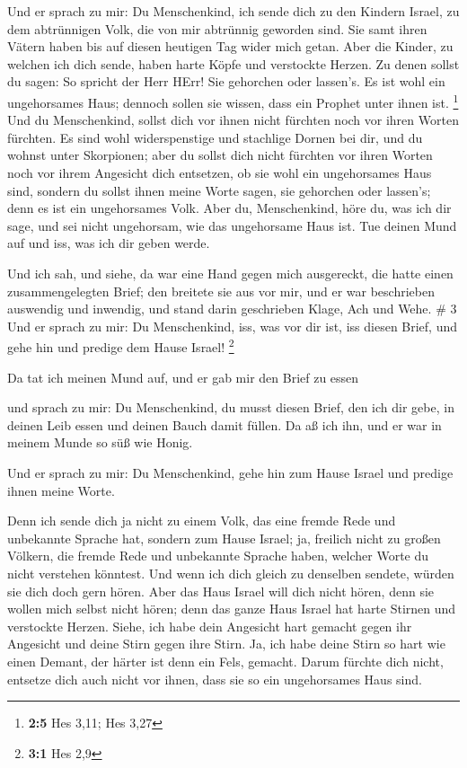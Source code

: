  Und er sprach zu mir: Du Menschenkind, ich sende dich zu
den Kindern Israel, zu dem abtrünnigen Volk, die von mir abtrünnig
geworden sind. Sie samt ihren Vätern haben bis auf diesen heutigen Tag
wider mich getan.  Aber die Kinder, zu welchen ich dich
sende, haben harte Köpfe und verstockte Herzen. Zu denen sollst du
sagen: So spricht der Herr HErr!  Sie gehorchen oder
lassen's. Es ist wohl ein ungehorsames Haus; dennoch sollen sie wissen,
dass ein Prophet unter ihnen ist. \footnote{\textbf{2:5} Hes 3,11; Hes
  3,27}  Und du Menschenkind, sollst dich vor ihnen nicht
fürchten noch vor ihren Worten fürchten. Es sind wohl widerspenstige und
stachlige Dornen bei dir, und du wohnst unter Skorpionen; aber du sollst
dich nicht fürchten vor ihren Worten noch vor ihrem Angesicht dich
entsetzen, ob sie wohl ein ungehorsames Haus sind,  sondern
du sollst ihnen meine Worte sagen, sie gehorchen oder lassen's; denn es
ist ein ungehorsames Volk.  Aber du, Menschenkind, höre du,
was ich dir sage, und sei nicht ungehorsam, wie das ungehorsame Haus
ist. Tue deinen Mund auf und iss, was ich dir geben werde.

 Und ich sah, und siehe, da war eine Hand gegen mich
ausgereckt, die hatte einen zusammengelegten Brief;  den
breitete sie aus vor mir, und er war beschrieben auswendig und inwendig,
und stand darin geschrieben Klage, Ach und Wehe. \# 3  Und
er sprach zu mir: Du Menschenkind, iss, was vor dir ist, iss diesen
Brief, und gehe hin und predige dem Hause Israel! \footnote{\textbf{3:1}
  Hes 2,9}

 Da tat ich meinen Mund auf, und er gab mir den Brief zu
essen

 und sprach zu mir: Du Menschenkind, du musst diesen Brief,
den ich dir gebe, in deinen Leib essen und deinen Bauch damit füllen. Da
aß ich ihn, und er war in meinem Munde so süß wie Honig.

 Und er sprach zu mir: Du Menschenkind, gehe hin zum Hause
Israel und predige ihnen meine Worte.

 Denn ich sende dich ja nicht zu einem Volk, das eine fremde
Rede und unbekannte Sprache hat, sondern zum Hause Israel; 
ja, freilich nicht zu großen Völkern, die fremde Rede und unbekannte
Sprache haben, welcher Worte du nicht verstehen könntest. Und wenn ich
dich gleich zu denselben sendete, würden sie dich doch gern hören.
 Aber das Haus Israel will dich nicht hören, denn sie wollen
mich selbst nicht hören; denn das ganze Haus Israel hat harte Stirnen
und verstockte Herzen.  Siehe, ich habe dein Angesicht hart
gemacht gegen ihr Angesicht und deine Stirn gegen ihre Stirn.
 Ja, ich habe deine Stirn so hart wie einen Demant, der
härter ist denn ein Fels, gemacht. Darum fürchte dich nicht, entsetze
dich auch nicht vor ihnen, dass sie so ein ungehorsames Haus sind.

